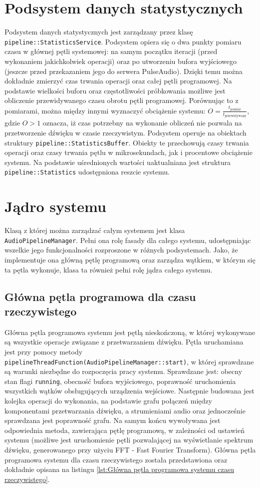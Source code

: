 \section{Podsystem danych statystycznych}
Podsystem danych statystycznych jest zarządzany przez klasę \texttt{pipeline::StatisticsService}. Podsystem opiera się o dwa punkty pomiaru czasu w głównej pętli systemowej: na samym początku iteracji (przed wykonaniem jakichkolwiek operacji) oraz po utworzeniu bufora wyjściowego (jeszcze przed przekazaniem jego do serwera PulseAudio\cite{bib:PulseAudio}). Dzięki temu można dokładnie zmierzyć czas trwania operacji oraz całej pętli programowej. Na podstawie wielkości buforu oraz częstotliwości próbkowania możliwe jest obliczenie przewidywanego czasu obrotu pętli programowej. Porównując to z pomiarami, można między innymi wyznaczyć obciążenie systemu: $O = \frac{t_{\text{pomiar}}}{t_{\text{przewidywany}}}$, gdzie $O > 1$ oznacza, iż czas potrzebny na wykonanie obliczeń nie pozwala na przetworzenie dźwięku w czasie rzeczywistym. Podsystem operuje na obiektach struktury \texttt{pipeline::StatisticsBuffer}. Obiekty te przechowują czasy trwania operacji oraz czasy trwania pętlu w mikrosekundach, jak i procentowe obciążenie systemu. Na podstawie uśrednionych wartości uaktualniana jest struktura \texttt{pipeline::Statistics} udostępniona reszcie systemu.

\section{Jądro systemu}
Klasą z której można zarządzać całym systemem jest klasa \texttt{AudioPipelineManager}. Pełni ona rolę fasady dla całego systemu, udostępniając wszelkie jego funkcjonalności rozproszone w różnych podsystemach. Jako, że implementuje ona główną pętlę programową oraz zarządza wątkiem, w którym się ta pętla wykonuje, klasa ta również pełni rolę jądra całego systemu. 

\subsection{Główna pętla programowa dla czasu rzeczywistego}
Główna pętla programowa systemu jest pętlą nieskończoną, w której wykonywane są wszystkie operacje związane z przetwarzaniem dźwięku. Pętla uruchamiana jest przy pomocy metody \texttt{pipelineThreadFunction(AudioPipelineManager::start)}, w której sprawdzane są warunki niezbędne do rozpoczęcia pracy systemu. Sprawdzane jest: obecny stan flagi \texttt{running}, obecność bufora wyjściowego, poprawność uruchomienia wszystkich wątków obsługujących urządzenia wejściowe. Następnie budowana jest kolejka operacji do wykonania, na podstawie grafu połączeń między komponentami przetwarzania dźwięku, a strumieniami audio oraz jednocześnie sprawdzana jest poprawność grafu. Na samym końcu wywoływana jest odpowiednia metoda, zawierająca pętlę programową, w zależności od ustawień systemu (możliwe jest uruchomienie pętli pozwalającej na wyświetlanie spektrum dźwięku, generowanego przy użyciu FFT - Fast Fourier Transform). Główna pętla programowa systemu dla czasu rzeczywistego została przedstawiona oraz dokładnie opisana na listingu \ref{lst:Główna pętla programowa systemu czasu rzeczywistego}. 

